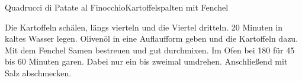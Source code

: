 \begin{recipe}{Quadrucci di Patate al Finocchio}{Kartoffelspalten mit Fenchel}
  \inglist

  \steps
  Die Kartoffeln schälen, längs vierteln und die Viertel dritteln. 20 Minuten in kaltes
  Wasser legen. Olivenöl in eine Auflaufform geben und die Kartoffeln dazu. Mit dem
  Fenchel Samen bestreuen und gut durchmixen. Im Ofen bei 180 \celsius für 45 bis 60
  Minuten garen. Dabei nur ein bis zweimal umdrehen. Anschließend mit Salz abschmecken.
\end{recipe}
